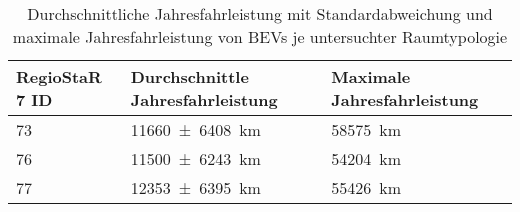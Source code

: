 {
\renewcommand{\arraystretch}{1.2}%
\begin{table}[H]
	\begin{center}
		\caption{Durchschnittliche Jahresfahrleistung mit Standardabweichung und maximale Jahresfahrleistung von BEVs je untersuchter Raumtypologie}
		\begin{tabu} to \textwidth {X[1] X[1.5, r] X[1.5, r]}
			\hline
			RegioStaR 7 ID 	   & Durchschnittle Jahresfahrleistung                  & Maximale Jahresfahrleistung \\ \hline
			\num{73}               & \SI[separate-uncertainty = true]{11660(6408)}{\km} & \SI{58575}{\km}             \\
			\num{76}               & \SI[separate-uncertainty = true]{11500(6243)}{\km} & \SI{54204}{\km}             \\
			\num{77}               & \SI[separate-uncertainty = true]{12353(6395)}{\km} & \SI{55426}{\km}             \\ \hline
		\end{tabu}
		\label{tab:bev_distance}
	\end{center}
	\vspace{-3mm}%
\end{table}
}